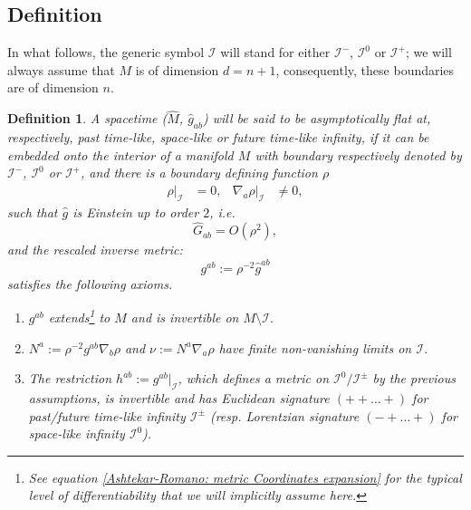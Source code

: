 \documentclass[a4paper, 10pt]{article}
\newtheorem{definition}{Definition}[section]
\theoremstyle{remark}
\newcommand{\correc}[1]{#1}
\newcommand{\pM}{\hat{M}}
\newcommand{\pg}{\hat{g}}
\begin{document}
\subsection{Definition}

\correc{In what follows, the generic symbol $\mathcal{I}$ will stand for either $\mathcal{I}^{-}$, $\mathcal{I}^{0}$ or $\mathcal{I}^{+}$; }we will always assume that $M$ is of dimension $d=n+1$, consequently, these boundaries are of dimension $n$.\


\begin{definition}\label{Definition:AsymptoticFlatness}
    A spacetime ($\pM$, $\pg_{ab}$) will be said to be asymptotically flat at, respectively, past time-like, space-like or future time-like infinity, if it can be embedded onto the interior of a manifold $M$ with boundary respectively denoted by $\mathcal{I}^{-}$, $\mathcal{I}^{0}$ or $\mathcal{I}^{+}$, and there is a boundary defining function $\rho$
    \begin{align}
        \rho\vert_{\mathcal{I}} &= 0, &  \nabla_a\rho\vert_{\mathcal{I}} & \neq 0,
    \end{align}
    such that $\pg$ is Einstein up to order $2$, i.e. \[ \hat{G}_{ab} = O(\rho^2),\] and the rescaled inverse metric:
    \begin{equation}\label{eq:rescaled_inverse_metric}
        g^{ab} := \rho^{-2} \pg^{ab}
    \end{equation}
    satisfies the following axioms.
    \begin{enumerate}
        \item $g^{ab}$ extends\footnote{See equation \eqref{Ashtekar-Romano: metric Coordinates expansion} for the typical level of differentiability that we will implicitly assume here.} to $M$ and is invertible on $M \setminus \mathcal{I}$. \label{AFSTCondition1}
        \item $N^a := \rho^{-2} g^{ab} \nabla_b \rho$ and $\nu := N^a \nabla_a \rho$ have finite non-vanishing limits on $\mathcal{I}$. \label{AFSTCondition2}
        \item The restriction $h^{ab} := g^{ab}\vert_{\mathcal{I}}$, which defines a metric on $\mathcal{I}^0/\mathcal{I}^\pm$ by the previous assumptions, is invertible and has Euclidean signature $(+ + \dots +)$ for past/future time-like infinity $\mathcal{I}^{\pm}$ (resp. Lorentzian signature $(- + \dots +)$ for space-like infinity $\mathcal{I}^0$). \label{AFSTCondition3}
    \end{enumerate}
\end{definition}
\end{document}
